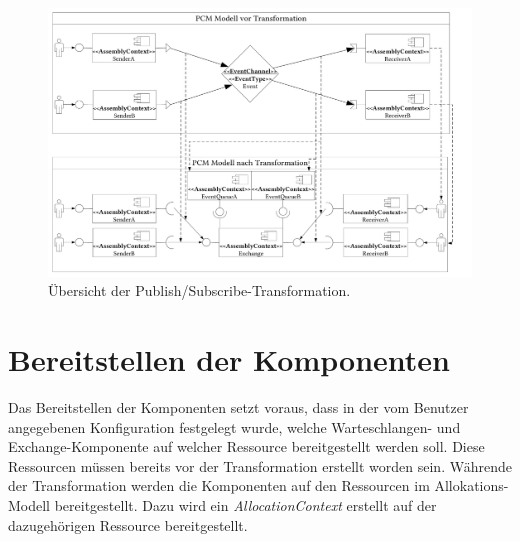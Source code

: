 \begin{figure}
\center
  \includegraphics[width=1.4\textwidth, angle=90]{images/transformation/transformationSystemPubSub.pdf}
  \caption{Übersicht der Publish/Subscribe-Transformation.}
  \label{img:transformationPubSub}
\end{figure}


\section{Bereitstellen der Komponenten}
Das Bereitstellen der Komponenten setzt voraus, dass in der vom Benutzer angegebenen Konfiguration festgelegt wurde, welche Warteschlangen- und Exchange-Komponente auf welcher Ressource bereitgestellt werden soll. Diese Ressourcen müssen bereits vor der Transformation erstellt worden sein. Währende der Transformation werden die Komponenten auf den Ressourcen im Allokations-Modell bereitgestellt. Dazu wird ein \emph{AllocationContext} erstellt auf der dazugehörigen Ressource bereitgestellt.

